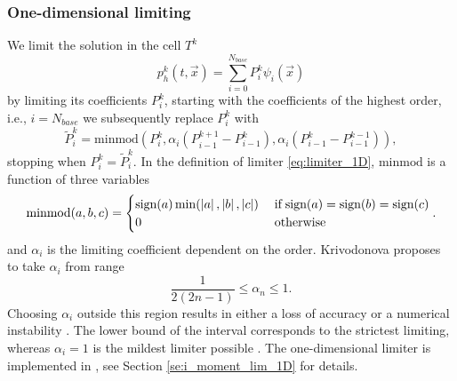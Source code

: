 \subsubsection{One-dimensional limiting}
\label{sse:moment_lim_1D}
We limit the solution in the cell $T^k$
\begin{equation}
\label{eq:el_lin_comb_lim}
p_h^k(t, \vec{x}) = \sum\limits_{i=0}^{N_{base}} P_i^k\psi_i(\vec{x})
\end{equation}
by limiting its coefficients $P_i^k$, starting with the coefficients of the
highest order, i.e., $i = N_{base}$ we subsequently replace
$P_i^k$ with
\begin{equation}
\label{eq:limiter_1D}
\tilde{P}_i^k = \text{minmod}\left(P_i^k,
\alpha_i(P_{i-1}^{k+1} - P_{i-1}^k),
\alpha_i (P_{i-1}^k - P_{i-1}^{k-1})\right),
\end{equation}
stopping when $P_i^k = \tilde{P}_i^k$. In the definition of limiter \eqref{eq:limiter_1D},
$\text{minmod}$ is a function of three
variables
\begin{equation}
\text{minmod}(a,b,c) =
\begin{cases}
\text{sign}(a)\min(\left\lvert a\right\rvert, \left\lvert b\right\rvert, \left\lvert c\right\rvert) & \;\text{if}\;
\text{sign}(a) =
\text{sign}(b) =
\text{sign}(c)\\
0 & \;\text{otherwise}
\end{cases}.
\end{equation}
and $\alpha_i$ is the limiting coefficient dependent on the order. Krivodonova
\cite{Krivodonova2007} proposes to take $\alpha_i$ from range
\begin{equation}
\frac{1}{2(2n -1)} \leq \alpha_n \leq 1.
\end{equation}
Choosing $\alpha_i$ outside this region results in either a loss of accuracy or
a numerical
instability \cite[p. 882]{Krivodonova2007}. The lower bound of the interval corresponds to
the strictest limiting, whereas $\alpha_i = 1$ is the mildest limiter possible \cite[p.
882]{Krivodonova2007}. The one-dimensional limiter is implemented in
, see Section \ref{se:i_moment_lim_1D} for details.

